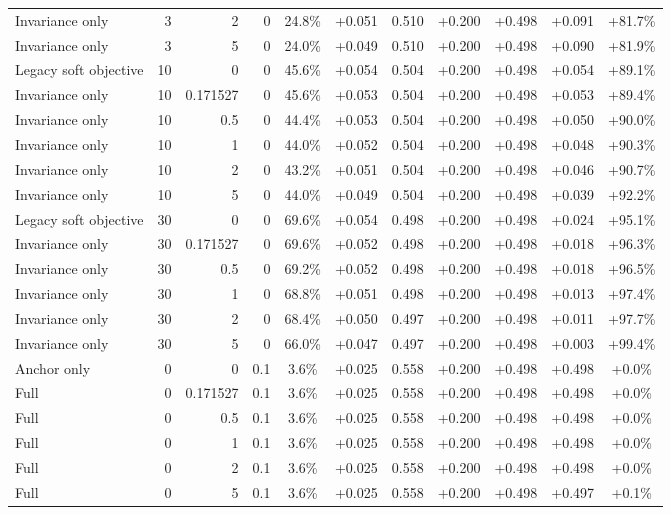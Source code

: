 \begin{table}[htbp]
\begin{tabular}{lrrrccccccc}
Invariance only & 3 & 2 & 0 & 24.8\% & +0.051 & 0.510 & +0.200 & +0.498 & +0.091 & +81.7\% \\
Invariance only & 3 & 5 & 0 & 24.0\% & +0.049 & 0.510 & +0.200 & +0.498 & +0.090 & +81.9\% \\
Legacy soft objective & 10 & 0 & 0 & 45.6\% & +0.054 & 0.504 & +0.200 & +0.498 & +0.054 & +89.1\% \\
Invariance only & 10 & 0.171527 & 0 & 45.6\% & +0.053 & 0.504 & +0.200 & +0.498 & +0.053 & +89.4\% \\
Invariance only & 10 & 0.5 & 0 & 44.4\% & +0.053 & 0.504 & +0.200 & +0.498 & +0.050 & +90.0\% \\
Invariance only & 10 & 1 & 0 & 44.0\% & +0.052 & 0.504 & +0.200 & +0.498 & +0.048 & +90.3\% \\
Invariance only & 10 & 2 & 0 & 43.2\% & +0.051 & 0.504 & +0.200 & +0.498 & +0.046 & +90.7\% \\
Invariance only & 10 & 5 & 0 & 44.0\% & +0.049 & 0.504 & +0.200 & +0.498 & +0.039 & +92.2\% \\
Legacy soft objective & 30 & 0 & 0 & 69.6\% & +0.054 & 0.498 & +0.200 & +0.498 & +0.024 & +95.1\% \\
Invariance only & 30 & 0.171527 & 0 & 69.6\% & +0.052 & 0.498 & +0.200 & +0.498 & +0.018 & +96.3\% \\
Invariance only & 30 & 0.5 & 0 & 69.2\% & +0.052 & 0.498 & +0.200 & +0.498 & +0.018 & +96.5\% \\
Invariance only & 30 & 1 & 0 & 68.8\% & +0.051 & 0.498 & +0.200 & +0.498 & +0.013 & +97.4\% \\
Invariance only & 30 & 2 & 0 & 68.4\% & +0.050 & 0.497 & +0.200 & +0.498 & +0.011 & +97.7\% \\
Invariance only & 30 & 5 & 0 & 66.0\% & +0.047 & 0.497 & +0.200 & +0.498 & +0.003 & +99.4\% \\
Anchor only & 0 & 0 & 0.1 & 3.6\% & +0.025 & 0.558 & +0.200 & +0.498 & +0.498 & +0.0\% \\
Full & 0 & 0.171527 & 0.1 & 3.6\% & +0.025 & 0.558 & +0.200 & +0.498 & +0.498 & +0.0\% \\
Full & 0 & 0.5 & 0.1 & 3.6\% & +0.025 & 0.558 & +0.200 & +0.498 & +0.498 & +0.0\% \\
Full & 0 & 1 & 0.1 & 3.6\% & +0.025 & 0.558 & +0.200 & +0.498 & +0.498 & +0.0\% \\
Full & 0 & 2 & 0.1 & 3.6\% & +0.025 & 0.558 & +0.200 & +0.498 & +0.498 & +0.0\% \\
Full & 0 & 5 & 0.1 & 3.6\% & +0.025 & 0.558 & +0.200 & +0.498 & +0.497 & +0.1\% \\

\end{tabular}
\end{table}

